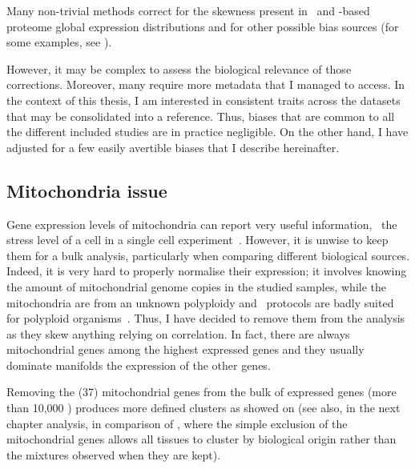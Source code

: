 Many non-trivial methods correct for the skewness present in
\Rnaseq\ and \ms-based proteome global expression distributions
and for other possible bias sources (for some examples, see \citet{batchEffect,%
Leek2014-bl,Yi2018-rv,Li2014-cv,Stegle2012-td}).

However, it may be complex to assess the biological relevance of those corrections.
Moreover, many require more metadata that I managed to access.
In the context of this thesis, I am interested in
consistent traits across the datasets that may be consolidated into a reference.
Thus, biases that are common to all the different included studies are in practice
negligible.
On the other hand, I have adjusted for a few easily avertible biases
that I describe hereinafter.

\subsection{Mitochondria issue}\label{subsec:mito}

Gene expression levels of mitochondria can report very useful information,
\eg\ the stress level of a cell in a single cell experiment~.
However, it is unwise to keep them for a bulk analysis, particularly when
comparing different biological sources.
Indeed, it is very hard to properly normalise their expression;
it involves knowing the amount of mitochondrial genome copies
in the studied samples, while the mitochondria are from an unknown polyploidy
and \Rnaseq\ protocols are badly suited for polyploid organisms~.
Thus, I have decided to remove them from the analysis as they skew anything relying
on correlation.
In fact, there are always mitochondrial genes among the highest expressed genes
and they usually dominate manifolds the expression of the other genes.

Removing the (37) mitochondrial genes from the bulk of expressed genes
(more than 10,000 \pcgs) produces more defined clusters as showed on
(see also, in the next chapter analysis,
 in comparison of ,
where the simple exclusion of the mitochondrial genes allows all tissues
to cluster by biological origin rather than the mixtures observed
when they are kept).

